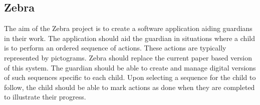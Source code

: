 \subsection{Zebra}
\label{sub:zebra}
The aim of the Zebra project is to create a software application aiding guardians in their work. The application should aid the guardian in situations where a child is to perform an ordered sequence of actions. These actions are typically represented by pictograms. %
Zebra should replace the current paper based version of this system. The guardian should be able to create and manage digital versions of such sequences specific to each child. Upon selecting a sequence for the child to follow, the child should be able to mark actions as done when they are completed to illustrate their progress.
